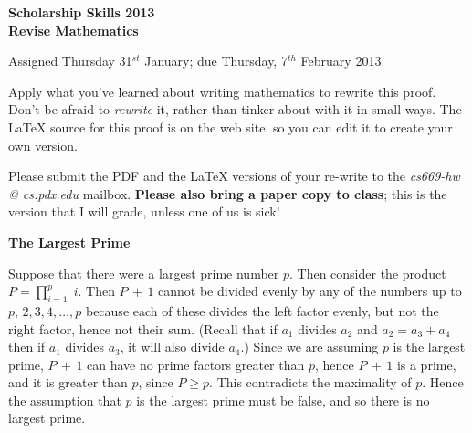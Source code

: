 \documentclass[12pt]{article}
\begin{document}
\begin{center}
\large
\bf
Scholarship Skills 2013\\[1ex]  %

\Large
Revise Mathematics
\normalsize

\vspace{1ex}
Assigned Thursday 31$^{st}$ January; due Thursday, 7$^{th}$ February 2013.
\\[2pc]  %
\end{center}


\noindent
Apply what you've learned about writing mathematics to rewrite this proof.  
Don't be afraid to \emph{rewrite} it, rather than tinker about with it in small ways.
The \LaTeX{} source for this proof is on the web site, so you can edit it to create your own version.

Please submit the PDF and the \LaTeX{} versions of your re-write to the \textit{cs669-hw @ cs.pdx.edu} mailbox.  \textbf{Please also bring a paper copy to class}; this is the version that I will grade, unless one of us is sick!

\vspace{15pt}    %

\begin{center}
\large
\textbf{The Largest Prime}
\end{center}
\normalsize
\noindent
Suppose that there were a largest prime number $p$. 
Then consider the product $P = \prod_{i=1}^{p} \; i$. 
Then $P\,+\,1$ 
cannot be divided evenly by any of the numbers
up to $p$, $2,3,4,\ldots,p$ because each of these divides the left
factor evenly, but not the right factor, hence not their sum.
(Recall that if $a_1$ divides $a_2$ and $a_2=a_3+a_4$ then if $a_1$
divides $a_3$, it will also divide $a_4$.)  
Since we are assuming
$p$ is the largest prime,
$P\,+\,1$ can have no prime factors greater than $p$,
hence $P\,+\,1$ is a prime, and
it is greater than $p$, since $P \ge p$.
This contradicts the maximality of $p$.  
Hence the assumption that
$p$ is the largest prime must be false, and so there is no largest
prime.
\end{document}

